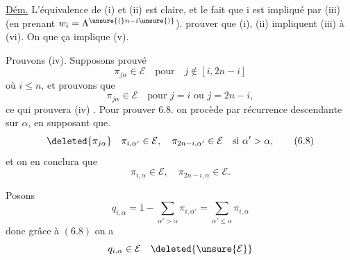 \uline{Dém.} L'équivalence de (i) et (ii) est claire, et le fait que i est impliqué par (iii) (en prenant $w_i=\Lambda^{\unsure{(}n-i\unsure{)}}$).  prouver que (i), (ii) impliquent (iii) à (vi). On  que ça implique  (v).

Prouvons (iv). Supposons prouvé
\[
\pi_{j\alpha}\in\mathcal E\quad\text{pour}\quad j\notin[i,2n-i]
\tag{6.7}
\]
où $i\leq n$, et prouvons que
\[
\pi_{j\alpha}\in\mathcal E\quad\text{pour }j=i\text{ ou }j=2n-i,
\tag{6.7'}
\]
ce qui prouvera (iv) . Pour prouver $6.8.$ on procède par récurrence  descendante sur $\alpha$, en supposant que.
\[
\deleted{\pi_{j\alpha}}\quad\pi_{i,\alpha'}\in\mathcal E,\quad\pi_{2n-i,\alpha'}\in\mathcal E\quad\text{si }\alpha'>\alpha,
\tag{6.8}
\]
et on en conclura que
\[
\pi_{i,\alpha}\in\mathcal E,\quad\pi_{2n-i,\alpha}\in\mathcal E.
\tag{6.8'}
\]

Posons
\[
q_{i,\alpha}=1-\sum_{\alpha'>\alpha}\pi_{i,\alpha'}=\sum_{\alpha'\leq\alpha}\pi_{i,\alpha}
\]
donc grâce à $(6.8)$ on a
\[
q_{i,\alpha}\in\mathcal E\quad\deleted{\unsure{\mathcal E}}
\]

